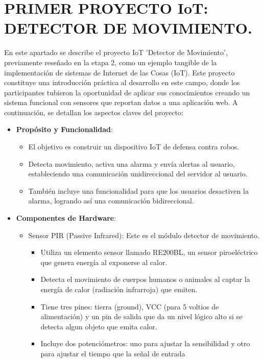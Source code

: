 \documentclass{report}
\begin{document}
\chapter{PRIMER PROYECTO IoT: DETECTOR DE MOVIMIENTO.}
En este apartado se describe el proyecto IoT 'Detector de Movimiento', previamente reseñado en la etapa 2, como un ejemplo tangible 
de la implementación de sistemas de Internet de las Cosas (IoT). Este proyecto constituye una introducción práctica al desarrollo 
en este campo, donde los participantes tubieron la oportunidad de aplicar sus conocimientos creando un sistema funcional con sensores 
que reportan datos a una aplicación web.
A continuación, se detallan los aspectos claves del proyecto:
\begin{itemize}
    \item \textbf{Propósito y Funcionalidad}:
    \begin{itemize}
        \item El objetivo es construir un dispositivo IoT de defensa contra robos.
        \item Detecta movimiento, activa una alarma y envía alertas al usuario, estableciendo una comunicación unidireccional del 
        servidor al usuario.
        \item También incluye una funcionalidad para que los usuarios desactiven la alarma, logrando así una comunicación bidireccional. 
    \end{itemize}
    \item \textbf{Componentes de Hardware}:
    \begin{itemize}
        \item Sensor PIR (Passive Infrared): Este es el módulo detector de movimiento.
            \begin{itemize}
                \item Utiliza un elemento sensor llamado RE200BL, un sensor piroeléctrico que genera energía al exponerse al calor.
                \item Detecta el movimiento de cuerpos humanos o animales al captar la energía de calor (radiación infrarroja) que emiten.
                \item Tiene tres pines: tierra (ground), VCC (para 5 voltios de alimentación) y un pin de salida que da un nivel lógico alto 
                si se detecta algun objeto que emita calor.
                \item Incluye dos potenciómetros: uno para ajustar la sensibilidad y otro para ajustar el tiempo que la señal de entrada 

\end{itemize}
\end{itemize}
\end{itemize}
\end{document}
